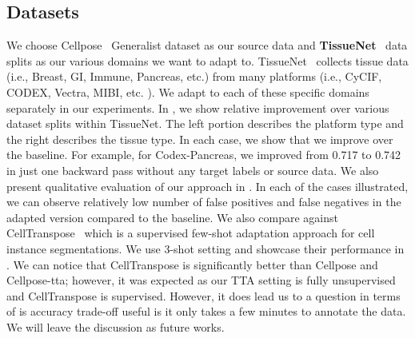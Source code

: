 \subsection{Datasets}
We choose Cellpose~\cite{stringer2021cellpose} Generalist dataset as our source data and \textbf{TissueNet}~\cite{TissueNet} data splits as our various domains we want to adapt to. TissueNet~\cite{TissueNet} collects tissue data (i.e., Breast, GI, Immune, Pancreas, etc.) from many platforms (i.e., CyCIF, CODEX, Vectra, MIBI, etc. ). We adapt to each of these specific domains separately in our experiments. In , we show relative improvement over various dataset splits within TissueNet. The left portion describes the platform type and the right describes the tissue type. In each case, we show that we improve over the baseline. For example, for Codex-Pancreas, we improved from 0.717 to 0.742 in just one backward pass without any target labels or source data. We also present qualitative evaluation of our approach in . In each of the cases illustrated, we can observe relatively low number of false positives and false negatives in the adapted version compared to the baseline. We also compare against CellTranspose~\cite{keaton2023celltranspose} which is a supervised few-shot adaptation approach for cell instance segmentations. We use 3-shot setting and showcase their performance in  . We can notice that CellTranspose is significantly better than Cellpose and Cellpose-tta; however, it was expected as our TTA setting is fully unsupervised and CellTranspose is supervised. However, it does lead us to a question in terms of is accuracy trade-off useful is it only takes a few minutes to annotate the data. We will leave the discussion as future works. 

\begin{table}
    
    \caption{Comparative analysis on various splits of TissueNet. We show improvement with test-time adaptation. }
    \label{tab:tn1}
\end{table}


